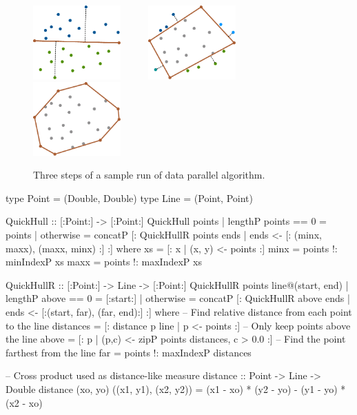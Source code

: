 \documentclass[preamble.tex]{subfiles}
\begin{document}
\begin{figure}
\includegraphics[width=0.3\textwidth]{img/Example-QuickHull-step1}~~~~~%
\includegraphics[width=0.3\textwidth]{img/Example-QuickHull-step2}~~~~~%
\includegraphics[width=0.3\textwidth]{img/Example-QuickHull-step3}%
\caption{Three steps of a sample run of data parallel \QuickHull algorithm.}
\label{fig:qh-result}
\end{figure}


\begin{hscode2}[%
  caption={\label{lst:dph-qh}\name{Data Parallel Haskell} implementation of \QuickHull.},
  numbers=left,
]
type Point = (Double, Double)
type Line  = (Point,  Point)

QuickHull :: [:Point:] -> [:Point:]
QuickHull points
  | lengthP points == 0 = points
  | otherwise
  = concatP [: QuickHullR points ends
                 | ends <- [: (minx, maxx), (maxx, minx) :] :]
  where
    xs   = [: x | (x, y) <- points :]
    minx = points !: minIndexP xs
    maxx = points !: maxIndexP xs

QuickHullR :: [:Point:] -> Line -> [:Point:]
QuickHullR points line@(start, end)
  | lengthP above == 0 = [:start:]
  | otherwise
  = concatP [: QuickHullR above ends
                 | ends <- [:(start, far), (far, end):] :]
  where
    -- Find relative distance from each point to the line
    distances = [: distance p line | p <- points :]
    -- Only keep points above the line
    above = [: p | (p,c) <- zipP points distances, c > 0.0 :]
    -- Find the point farthest from the line
    far = points !: maxIndexP distances

-- Cross product used as distance-like measure
distance :: Point -> Line -> Double
distance (xo, yo) ((x1, y1), (x2, y2))
  = (x1 - xo) * (y2 - yo) - (y1 - yo) * (x2 - xo)
\end{hscode2}
\end{document}
